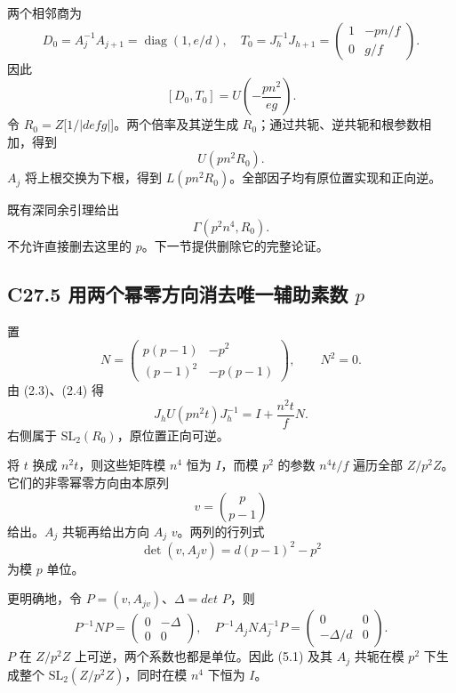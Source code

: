 \documentclass[11pt,a4paper]{article}
\theoremstyle{definition}
\numberwithin{equation}{section}
\begin{document}
{两个相邻商为} \[
D_0=A_j^{-1}A_{j+1}=\operatorname{diag}(1,e/d),
\quad
T_0=J_h^{-1}J_{h+1}
=\begin{pmatrix}1&-pn/f\\0&g/f\end{pmatrix}.
\] {因此} \[
\boxed{[D_0,T_0]=U\!\left(-\frac{pn^2}{eg}\right).}
\tag{C27.4.1}
\] {令} {\ensuremath{R_{0}=Z}{[}\ensuremath{1/|defg|}{]}。两个倍率及其逆生成} {\ensuremath{R_{0}}；通过共轭、逆共轭和根参数相加，得到} \[
U(pn^2R_0).
\] {\ensuremath{A_{j}}} {将上根交换为下根，得到} {\ensuremath{L(pn^{2}R_{0})}。全部因子均有原位置实现和正向逆。}

{既有深同余引理给出} \[
\Gamma(p^2n^4,R_0).
\tag{C27.4.2}
\] {不允许直接删去这里的} {\ensuremath{p}。下一节提供删除它的完整论证。}

\subsection*{\texorpdfstring{{C27.5} {用两个幂零方向消去唯一辅助素数} {\ensuremath{p}}}{C27.5 用两个幂零方向消去唯一辅助素数 }}\label{C27-h172}

{置} \[
N=\begin{pmatrix}
p(p-1)&-p^2\\
(p-1)^2&-p(p-1)
\end{pmatrix},
\qquad N^2=0.
\] {由} {(2.3)、(2.4)} {得} \[
J_hU(pn^2t)J_h^{-1}=I+\frac{n^2t}{f}N.
\tag{C27.5.1}
\] {右侧属于} {\ensuremath{\mathrm{SL}_{2}(R_{0})}，原位置正向可逆。}

{将} {\ensuremath{t}} {换成} {\ensuremath{n^{2}t}，则这些矩阵模} {\ensuremath{n^{4}}} {恒为} {\ensuremath{I}，而模} {\ensuremath{p^{2}}} {的参数} {\ensuremath{n^{4}t/f}} {遍历全部} {\ensuremath{Z/p^{2}Z}。它们的非零幂零方向由本原列} \[
v=\binom p{p-1}
\] {给出。\ensuremath{A_{j}}} {共轭再给出方向} {\ensuremath{A_{j}}} {\ensuremath{v}。两列的行列式} \[
\det(v,A_jv)=d(p-1)^2-p^2
\tag{C27.5.2}
\] {为模} {\ensuremath{p}} {单位。}

{更明确地，令} {\ensuremath{P=(v,A_{jv})}、\ensuremath{\Delta =det}} {\ensuremath{P}，则} \[
P^{-1}NP=\begin{pmatrix}0&-\Delta\\0&0\end{pmatrix},
\quad
P^{-1}A_jNA_j^{-1}P=
\begin{pmatrix}0&0\\-\Delta/d&0\end{pmatrix}.
\tag{C27.5.3}
\] {\ensuremath{P}} {在} {\ensuremath{Z/p^{2}Z}} {上可逆，两个系数也都是单位。因此} {(5.1)} {及其} {\ensuremath{A_{j}}} {共轭在模} {\ensuremath{p^{2}}} {下生成整个} {\ensuremath{\mathrm{SL}_{2}(Z/p^{2}Z)}，同时在模} {\ensuremath{n^{4}}} {下恒为} {\ensuremath{I}。}
\end{document}
